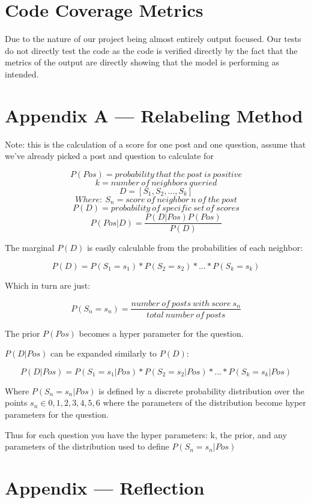 \documentclass[12pt, titlepage]{article}
\begin{document}
\begin{enumerate}
\section{Code Coverage Metrics}
Due to the nature of our project being almost entirely output focused. Our tests do not directly test the code as the code is verified directly by the fact that the metrics of the output are directly showing that the model is performing as intended.






\newpage{}
\section*{Appendix A --- Relabeling Method} \label{apA}

Note: this is the calculation of a score for one post and one question, assume that we've already picked a post and question to calculate for

$$P(Pos) = probability\ that\ the\ post\ is\ positive$$
$$k = number\ of\ neighbors\ queried$$
$$D = [S_{1}, S_{2}, ..., S_{k}]$$
$$Where:\ S_{n} = score\ of\ neighbor\ n\ of\ the\ post$$
$$P(D) = probability\ of\ specific\ set\ of\ scores$$
$$P(Pos|D) = \frac{P(D|Pos)P(Pos)}{P(D)}$$

The marginal $P(D)$ is easily calculable from the probabilities of each neighbor:

$$P(D) = P(S_1 = s_1)*P(S_2 = s_2)*...*P(S_k = s_k)$$

Which in turn are just:

$$P(S_n = s_n) = \frac{number\ of\ posts\ with\ score\ s_n}{total\ number\ of\ posts}$$

The prior $P(Pos)$ becomes a hyper parameter for the question.

$P(D|Pos)$ can be expanded similarly to $P(D)$:

$$P(D|Pos) = P(S_1 = s_1|Pos)*P(S_2 = s_2|Pos)*...*P(S_k = s_k|Pos)$$

Where $P(S_n = s_n|Pos)$ is defined by a discrete probability distribution over the points $s_n \in {0,1,2,3,4,5,6}$ where the parameters of the distribution become hyper parameters for the question.

Thus for each question you have the hyper parameters: k, the prior, and any parameters of the distribution used to define $P(S_n = s_n|Pos)$

\newpage{}
\section*{Appendix --- Reflection}



\end{enumerate}
\end{document}
